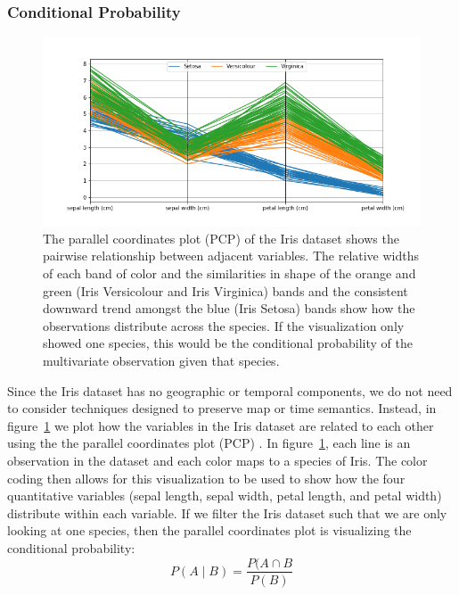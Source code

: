 \documentclass[letterpaper,onecolumn,titlepage]{Ythesis}
\begin{document}
\subsubsection{Conditional Probability}
\begin{figure}[H]
\includegraphics[width=\textwidth]{intro/iris_parallel}
\caption{The parallel coordinates plot (PCP) of the Iris dataset shows the pairwise relationship between adjacent variables. The relative widths of each band of color and the similarities in shape of the orange and green (Iris Versicolour and Iris Virginica) bands and the consistent downward trend amongst the blue (Iris Setosa) bands show how the observations distribute across the species. If the visualization only showed one species, this would be the conditional probability of the multivariate observation given that species.}
\label{fig:iris_parallel}
\end{figure}

Since the Iris dataset has no geographic or temporal components, we do not need to consider techniques designed to preserve map or time semantics. Instead, in figure~\ref{fig:iris_parallel} we plot how the variables in the Iris dataset are related to each other using the the parallel coordinates plot (PCP) \cite{claessen_flexible_2011,_nist/sematech_????,inselberg_plane_1985, wegman_hyperdimensional_1990}. In figure~\ref{fig:iris_parallel}, each line is an observation in the dataset and each color maps to a species of Iris. The color coding then allows for this visualization to be used to show how the four quantitative variables (sepal length, sepal width, petal length, and petal width) distribute within each variable. If we filter the Iris dataset such that we are only looking at one species, then the parallel coordinates plot is visualizing the conditional probability:
\begin{equation}
P(A\mid B) = \frac{P(A \cap B}{P(B)} 
\end{equation}
\end{document}
